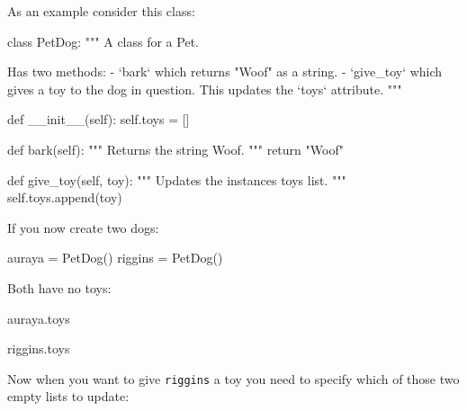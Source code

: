 As an example consider this class:




\begin{pyin}
class PetDog:
    """
    A class for a Pet.

    Has two methods:
        - `bark` which returns "Woof" as a string.
        - `give_toy` which gives a toy to the dog in question. This updates the
          `toys` attribute.
    """

    def __init__(self):
        self.toys = []

    def bark(self):
        """
        Returns the string Woof.
        """
        return "Woof"

    def give_toy(self, toy):
        """
        Updates the instances toys list.
        """
        self.toys.append(toy)
\end{pyin}





If you now create two dogs:




\begin{pyin}
auraya = PetDog()
riggins = PetDog()
\end{pyin}





Both have no toys:




\begin{pyin}
auraya.toys
\end{pyin}





\begin{raw}
[]
\end{raw}







\begin{pyin}
riggins.toys
\end{pyin}





\begin{raw}
[]
\end{raw}





Now when you want to give \texttt{riggins} a toy you need to specify which of those two
empty lists to update:




